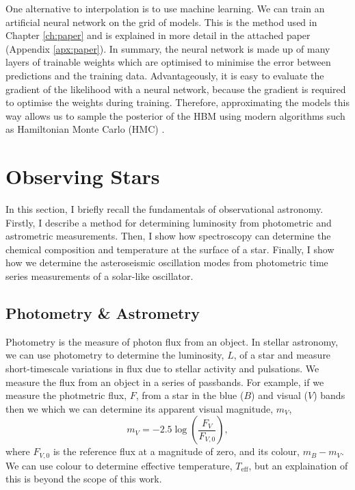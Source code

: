 One alternative to interpolation is to use machine learning. We can train an artificial neural network on the grid of models. This is the method used in Chapter \ref{ch:paper} and is explained in more detail in the attached paper (Appendix \ref{apx:paper}). In summary, the neural network is made up of many layers of trainable weights which are optimised to minimise the error between predictions and the training data. Advantageously, it is easy to evaluate the gradient of the likelihood with a neural network, because the gradient is required to optimise the weights during training. Therefore, approximating the models this way allows us to sample the posterior of the HBM using modern algorithms such as Hamiltonian Monte Carlo (HMC) \citep[see e.g. the No-U-Turn Sampler][]{Homan.Gelman2014}.

\section{Observing Stars}\label{sec:obs}

In this section, I briefly recall the fundamentals of observational astronomy. Firstly, I describe a method for determining luminosity from photometric and astrometric measurements. Then, I show how spectroscopy can determine the chemical composition and temperature at the surface of a star. Finally, I show how we determine the asteroseismic oscillation modes from photometric time series measurements of a solar-like oscillator.

\subsection{Photometry \& Astrometry}

Photometry is the measure of photon flux from an object. In stellar astronomy, we can use photometry to determine the luminosity, $L$, of a star and measure short-timescale variations in flux due to stellar activity and pulsations. We measure the flux from an object in a series of passbands. For example, if we measure the photmetric flux, $F$, from a star in the blue ($B$) and visual ($V$) bands then we which we can determine its apparent visual magnitude, $m_V$,
\begin{equation}
    m_V = - 2.5 \log\left(\frac{F_V}{F_{V,0}}\right),
\end{equation}
where $F_{V,0}$ is the reference flux at a magnitude of zero, and its colour, $m_B - m_V$. We can use colour to determine effective temperature, $T_\mathrm{eff}$, but an explaination of this is beyond the scope of this work.

